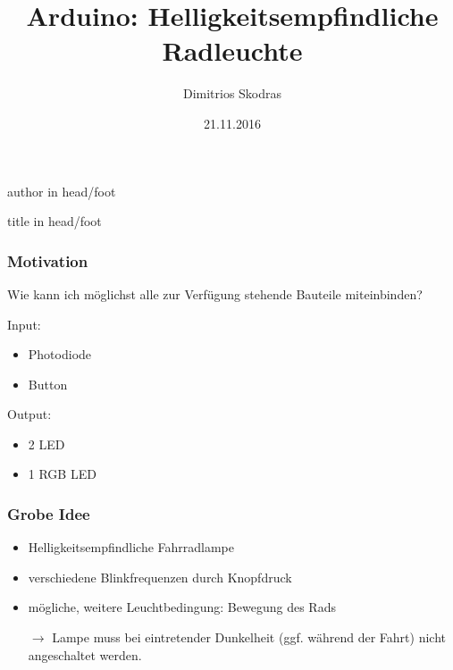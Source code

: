 \documentclass[hyperref={pdfpagelabels=false}]{beamer}
\title[Arduino Vortrag]{Arduino: Helligkeitsempfindliche Radleuchte}
\institute{Fortgeschrittenen Praktikum\\
Technische Universit\"at Dortmund}
\author{Dimitrios Skodras}
\date{21.11.2016}
\begin{document}
{%
  \leavevmode%
 \begin{beamercolorbox}%
    [wd=.5\paperwidth,ht=2.5ex,dp=1.125ex,leftskip=.3cm,rightskip=.3cm]%
    {author in head/foot}%
    \hfill\insertshortauthor
  \end{beamercolorbox}%
  \begin{beamercolorbox}%
    [wd=.5\paperwidth,ht=2.5ex,dp=1.125ex,leftskip=.3cm ,rightskip=.3cm]%
    {title in head/foot}%
    \insertshorttitle\hfill\insertframenumber{}
  \end{beamercolorbox}%
}%

\captionsetup[figure]{font=small,skip=0pt}
\begin{frame}
\titlepage
\end{frame} 

% 
% 

 \begin{frame}
  \frametitle{Motivation}
  Wie kann ich möglichst alle zur Verfügung stehende Bauteile miteinbinden?
  \vspace{0.3cm}
  
  
  \begin{minipage}{0.49\textwidth}
   Input:
   \begin{itemize}
    \item Photodiode
    \item Button
   \end{itemize}
  \end{minipage}
    \begin{minipage}{0.49\textwidth}
    Output:
   \begin{itemize}
    \item 2 LED
    \item 1 RGB LED
   \end{itemize}
  \end{minipage}

 \end{frame}
 
 \begin{frame}
  \frametitle{Grobe Idee}
  \begin{itemize}
   \item Helligkeitsempfindliche Fahrradlampe
   \item verschiedene Blinkfrequenzen durch Knopfdruck
   \item mögliche, weitere Leuchtbedingung: Bewegung des Rads
   \item[$\rightarrow$] Lampe muss bei eintretender Dunkelheit (ggf. während der Fahrt) nicht angeschaltet werden.
  \end{itemize}
 \end{frame}
\end{document}
